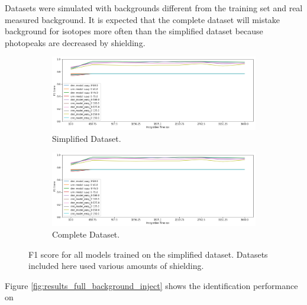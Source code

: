 Datasets were simulated with backgrounds different from the training set and real measured background. It is expected that the complete dataset will mistake background for isotopes more often than the simplified dataset because photopeaks are decreased by shielding.


\begin{figure}[H]
     \centering
     \begin{subfigure}[b]{0.9\textwidth}
         \centering
         \includegraphics[width=\textwidth]{images/results_easy_distance_comparison}
         \caption{Simplified Dataset.}
         \label{fig:fig:results_easy_background_simulated_simple}
     \end{subfigure}

     \begin{subfigure}[b]{0.9\textwidth}
         \centering
         \includegraphics[width=\textwidth]{images/results_easy_distance_comparison}
         \caption{Complete Dataset.}
         \label{fig:fig:results_easy_background_simulated_full}
     \end{subfigure}
        \caption{F1 score for all models trained on the simplified dataset. Datasets included here used various amounts of shielding.}
        \label{fig:results_easy_background_simulated}
\end{figure}



Figure \ref{fig:results_full_background_inject} shows the identification performance on 

